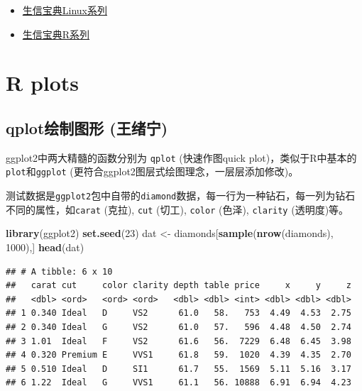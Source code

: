 \documentclass[]{article}
\newenvironment{Shaded}{\begin{snugshade}}{\end{snugshade}}
\newcommand{\KeywordTok}[1]{\textcolor[rgb]{0.13,0.29,0.53}{\textbf{{#1}}}}
\newcommand{\DecValTok}[1]{\textcolor[rgb]{0.00,0.00,0.81}{{#1}}}
\newcommand{\StringTok}[1]{\textcolor[rgb]{0.31,0.60,0.02}{{#1}}}
\newcommand{\NormalTok}[1]{{#1}}
\providecommand{\tightlist}{%
  \setlength{\itemsep}{0pt}\setlength{\parskip}{0pt}}
\numberwithin{figure}{section}
\numberwithin{table}{section}
\theoremstyle{definition}
\theoremstyle{definition}
\theoremstyle{definition}
\theoremstyle{remark}
\begin{document}
\begin{itemize}
\tightlist
\item
  \href{http://mp.weixin.qq.com/s/hEYU80fPf1eD5OWL3fO4Bg}{生信宝典Linux系列}
\item
  \href{https://mp.weixin.qq.com/s/bsvB1k17Izom2ldgdwXrdg}{生信宝典R系列}
\end{itemize}

\section{R plots}\label{r-plots}

\subsection{qplot绘制图形 (王绪宁)}\label{qplot-}

ggplot2中两大精髓的函数分别为 \texttt{qplot} (快速作图quick
plot)，类似于R中基本的\texttt{plot}和\texttt{ggplot}
(更符合ggplot2图层式绘图理念，一层层添加修改)。

测试数据是\texttt{ggplot2}包中自带的\texttt{diamond}数据，每一行为一种钻石，每一列为钻石不同的属性，如\texttt{carat}
(克拉), \texttt{cut} (切工), \texttt{color} (色泽), \texttt{clarity}
(透明度)等。

\begin{Shaded}
\begin{Highlighting}[]
\KeywordTok{library}\NormalTok{(ggplot2)}
\KeywordTok{set.seed}\NormalTok{(}\DecValTok{23}\NormalTok{)}
\NormalTok{dat <-}\StringTok{ }\NormalTok{diamonds[}\KeywordTok{sample}\NormalTok{(}\KeywordTok{nrow}\NormalTok{(diamonds), }\DecValTok{1000}\NormalTok{),]}
\KeywordTok{head}\NormalTok{(dat)}
\end{Highlighting}
\end{Shaded}

\begin{verbatim}
## # A tibble: 6 x 10
##   carat cut     color clarity depth table price     x     y     z
##   <dbl> <ord>   <ord> <ord>   <dbl> <dbl> <int> <dbl> <dbl> <dbl>
## 1 0.340 Ideal   D     VS2      61.0   58.   753  4.49  4.53  2.75
## 2 0.340 Ideal   G     VS2      61.0   57.   596  4.48  4.50  2.74
## 3 1.01  Ideal   F     VS2      61.6   56.  7229  6.48  6.45  3.98
## 4 0.320 Premium E     VVS1     61.8   59.  1020  4.39  4.35  2.70
## 5 0.510 Ideal   D     SI1      61.7   55.  1569  5.11  5.16  3.17
## 6 1.22  Ideal   G     VVS1     61.1   56. 10888  6.91  6.94  4.23
\end{verbatim}
\end{document}
